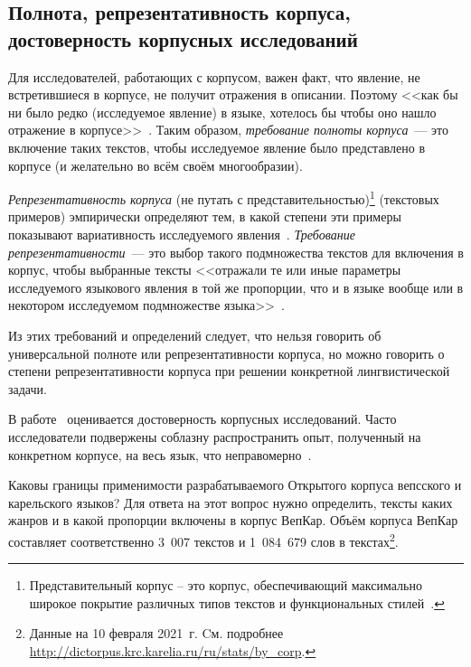
\subsection{Полнота, репрезентативность корпуса, достоверность корпусных исследований} \label{sect_corpus_representativeness}

Для исследователей, работающих с корпусом, важен факт, что 
явление, не встретившиеся в корпусе, не получит отражения в описании. 
Поэтому 
<<как бы ни было редко (исследуемое явление) в языке, 
хотелось бы чтобы оно нашло отражение в корпусе>>~\cite[с.~413]{Kibrik2019}. 
Таким образом, \emph{требование полноты корпуса}~--- это включение таких текстов, 
чтобы исследуемое явление было представлено в корпусе 
(и желательно во всём своём многообразии).


\emph{Репрезентативность корпуса} 
(не путать с представительностью)\footnote{Представительный корпус -- 
это корпус, обеспечивающий максимально широкое покрытие  
различных типов текстов и функциональных стилей~\cite{Sharov2004}.
} 
(текстовых примеров) 
эмпирически определяют тем, в какой степени эти примеры показывают 
вариативность исследуемого явления~\cite{Biber1993representativeness}. 
%
\emph{Требование репрезентативности}~--- это выбор такого подмножества текстов 
для включения в корпус, 
чтобы выбранные тексты 
<<отражали те или иные параметры исследуемого языкового явления в той же пропорции, 
что и в языке вообще или в некотором исследуемом подмножестве языка>>~\cite[с.~413]{Kibrik2019}.

Из этих требований и определений следует, что 
нельзя говорить об универсальной полноте или репрезентативности корпуса, 
но можно говорить 
о степени репрезентативности корпуса при решении конкретной лингвистической задачи.



В работе~\cite{Belikov2013}
оценивается достоверность корпусных исследований. 
Часто исследователи подвержены соблазну распространить опыт, полученный на конкретном корпусе, 
на весь язык, что неправомерно~\cite{Belikov2013}.

Каковы границы применимости разрабатываемого Открытого корпуса вепсского и карельского языков? 
Для ответа на этот вопрос нужно определить, тексты каких жанров и в какой пропорции включены в корпус ВепКар. 
Объём корпуса ВепКар составляет соответственно 3~007 текстов и 1~084~679 слов в текстах\footnote{ Данные на 10 февраля 2021~г. Cм. подробнее 
\href{http://dictorpus.krc.karelia.ru/ru/stats/by\_corp}{http://dictorpus.krc.karelia.ru/ru/stats/by\_corp}.}.

